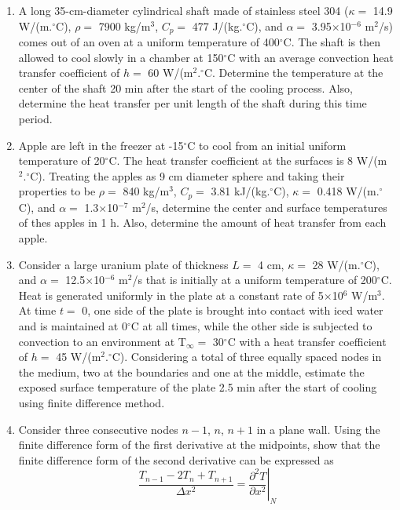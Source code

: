 \documentclass[12pts,a4paper,amsmath,amssymb,floatfix]{article}%
\newcommand{\frc}{\displaystyle\frac}
\begin{document}
\begin{enumerate}[label=\bfseries Problem \arabic*:]
\item\label{Problem:Analytical_Cylinder} A long 35-cm-diameter cylindrical shaft made of stainless steel 304 ($\kappa=$ 14.9 W/(m.$^{\circ}$C), $\rho=$ 7900 kg/m$^{3}$, $C_{p}=$ 477 J/(kg.$^{\circ}$C), and $\alpha=$ 3.95$\times$10$^{-6}$ m$^{2}$/s) comes out of an oven at a uniform temperature of 400$^{\circ}$C. The shaft is then allowed to cool slowly in a chamber at 150$^{\circ}$C with an average convection heat transfer coefficient of $h=$ 60 W/(m$^{2}.^{\circ}$C. Determine the temperature at the center of the shaft 20 min after the start of the cooling process. Also, determine the heat transfer per unit length of the shaft during this time period.

\item\label{Problem:Analytical_Sphere}  Apple are left in the freezer at -15$^{\circ}$C to cool from an initial uniform temperature of 20$^{\circ}$C. The heat transfer coefficient at the surfaces is 8 W/(m$^{2}.^{\circ}$C). Treating the apples as 9 cm diameter sphere and taking their properties to be $\rho=$  840 kg/m$^{3}$, $C_{p}=$ 3.81 kJ/(kg.$^{\circ}$C), $\kappa=$ 0.418 W/(m.$^{\circ}$C), and  $\alpha=$ 1.3$\times$10$^{-7}$ m$^{2}$/s, determine the center and surface temperatures of thes apples in 1 h. Also, determine the amount of heat transfer from each apple.


\item\label{Problem:FDM_Plate} Consider a large uranium plate of thickness $L=$ 4 cm, $\kappa =$ 28 W/(m.$^{\circ}$C), and $\alpha =$ 12.5$\times$10$^{-6}$ m$^{2}$/s that is initially at a uniform temperature of 200$^{\circ}$C. Heat is generated uniformly in the plate at a constant rate of 5$\times$10$^{6}$ W/m$^{3}$. At time $t=$ 0, one side of the plate is brought into contact with iced water and is maintained at 0$^{\circ}$C at all times, while the other side is subjected to convection to an environment at T$_{\infty}=$ 30$^{\circ}$C with a heat transfer coefficient of $h=$ 45 W/(m$^{2}.^{\circ}$C). Considering a total of three equally spaced nodes in the medium, two at the boundaries and one at the middle, estimate the exposed surface temperature of the plate 2.5 min after the start of cooling using finite difference method.

\item\label{Problem:FDM_Derivation} Consider three consecutive nodes $n-1$, $n$, $n+1$ in a plane wall. Using the finite difference form of the first derivative at the midpoints, show that the finite difference form of  the second derivative can be expressed as
\begin{displaymath}
  \frc{T_{n-1}-2T_{n}+T_{n+1}}{\Delta x^{2}} = \left.\frc{\partial^{2} T}{\partial x^{2}}\right|_{N}
\end{displaymath}


\end{enumerate}
\end{document}
